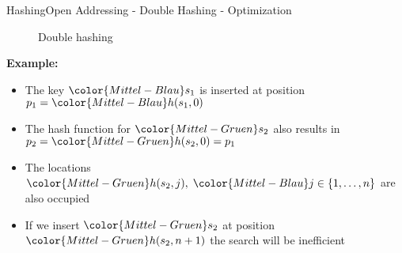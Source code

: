
\begin{frame}{Hashing}{Open Addressing - Double Hashing - Optimization}
  \vspace{-2.0em}
  \begin{figure}[!h]
    \begin{adjustbox}{width=0.9\linewidth}%
    \end{adjustbox}
    \vspace{-1.0em}
    \caption{Double hashing}%
    \label{fig:hashing:open_addressing:double_hashing_no_brent2}%
  \end{figure}
  \vspace{-1.0em}
  \textbf{Example:}
  \begin{itemize}
    \item
      The key ${\color{Mittel-Blau}s_1}$ is inserted at position
      \begin{math}
        p_1 = {\color{Mittel-Blau}h(s_1, 0)}
      \end{math}
    \item
      The hash function for ${\color{Mittel-Gruen}s_2}$ also results in
      \begin{math}
        p_2 = {\color{Mittel-Gruen}h(s_2, 0)} = p_1
      \end{math}
    \item
      The locations
      \begin{math}
        {\color{Mittel-Gruen}h(s_2, j)}, \;
        {\color{Mittel-Blau}j} \in \{1,\dots,n\}
      \end{math}
      are also occupied
    \item
      If we insert ${\color{Mittel-Gruen}s_2}$ at position
      ${\color{Mittel-Gruen}h(s_2, n + 1)}$ the search will be inefficient
  \end{itemize}
\end{frame}


